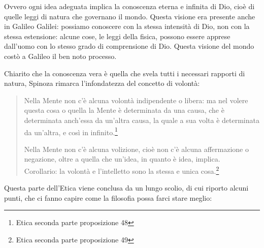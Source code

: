 Ovvero ogni idea adeguata implica la conoscenza eterna e infinita di Dio, cioè di quelle leggi di natura che governano il mondo. Questa visione era presente anche in Galileo Galilei: possiamo conoscere con la stessa intensità di Dio, non con la stessa estensione: alcune cose, le leggi della fisica, possono essere apprese dall'uomo con lo stesso grado di comprensione di Dio. Questa visione del mondo costò a Galileo il ben noto processo.

Chiarito che la conoscenza vera è quella che svela tutti i necessari rapporti di natura, Spinoza rimarca l'infondatezza del concetto di volontà:

\begin{quotation}
	\small Nella Mente non c’è alcuna volontà indipendente o libera: ma nel volere questa cosa o
	quella la Mente è determinata da una causa, che è determinata anch’essa da un’altra causa,
	la quale a sua volta è determinata da un’altra, e così in infinito.\footnote{Etica seconda parte proposizione 48}
	
	\small Nella Mente non c’è alcuna volizione, cioè non c’è alcuna affermazione o negazione, oltre
	a quella che un’idea, in quanto è idea, implica.\\Corollario: la volontà e l’intelletto sono la stessa e unica cosa.\footnote{Etica seconda parte proposizione 49}
\end{quotation}

Questa parte dell'Etica viene conclusa da un lungo scolio, di cui riporto alcuni punti, che ci fanno capire come la filosofia possa farci stare meglio:

